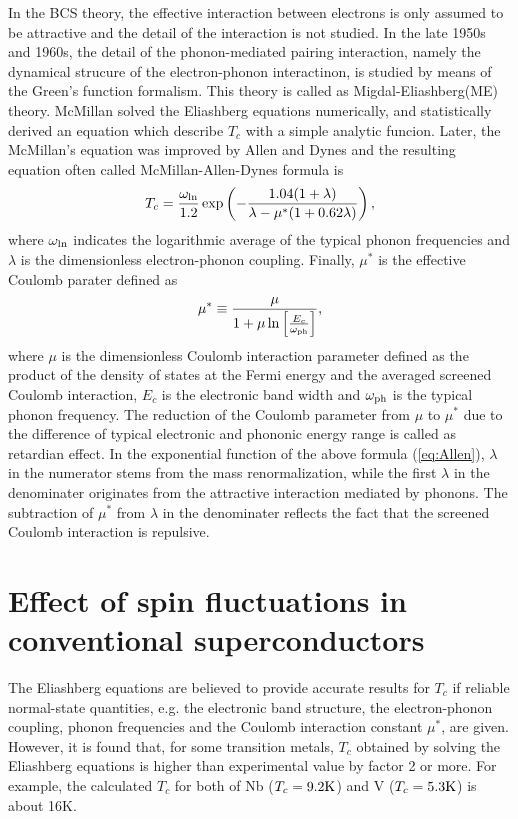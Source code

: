 In the BCS theory, the effective interaction between electrons is only assumed to be attractive and
the detail of the interaction is not studied.
In the late 1950s and 1960s, the detail of the phonon-mediated pairing interaction, namely the 
dynamical strucure of the electron-phonon interactinon, is studied by means of the Green's function 
formalism\cite{Migdal1958,Nambu1960,Eliashberg1960,Morel1962,Schrieffer1964,Scalapino1966}. 
This theory is called as Migdal-Eliashberg(ME) theory.
McMillan\cite{McMillan1968} solved the Eliashberg equations\cite{Parks1969} numerically, 
and statistically derived an equation which describe $T_c$ with a simple analytic funcion. 
Later, the McMillan's equation was improved by Allen and Dynes\cite{AllenDynes} and the resulting 
equation often called McMillan-Allen-Dynes formula is
%
\begin{equation}
	T_c = \frac{\omega_{\rm ln}}{1.2} \exp \left( -\frac{1.04(1+\lambda)}
	{\lambda-\mu^{\ast}(1+0.62\lambda)} \right),
	\label{eq:Allen}
\end{equation}
%
where $\omega_{\rm ln}$ indicates the logarithmic average of the typical phonon frequencies and
$\lambda$ is the dimensionless electron-phonon coupling. Finally, $\mu^{\ast}$ is the effective Coulomb
parater defined as
%
\begin{equation}
	\mu^{\ast} \equiv \frac{\mu}{1 + \mu \ln \left[ \frac{E_c}{\omega_{\rm ph}} \right]},
	\label{eq:mustar}
\end{equation}
%
where $\mu$ is the dimensionless Coulomb interaction parameter defined as the product of the density
of states at the Fermi energy and the averaged screened Coulomb interaction, $E_c$ is the
electronic band width and $\omega_{\rm ph}$ is the typical phonon frequency.
The reduction of the Coulomb parameter from $\mu$ to $\mu^{\ast}$ due to the difference of 
typical electronic and phononic energy range is called as retardian effect\cite{Bogo1958,Morel1962}.
In the exponential function of the above formula (\ref{eq:Allen}), $\lambda$ in the numerator
stems from the mass renormalization, while the first $\lambda$ in the denominater originates from
the attractive interaction mediated by phonons. The subtraction of $\mu^{\ast}$ from $\lambda$ in the
denominater reflects the fact that the screened Coulomb interaction is repulsive.

\section{Effect of spin fluctuations in conventional superconductors} %
The Eliashberg equations are believed to provide accurate results for $T_c$
if reliable normal-state quantities, e.g. the electronic band structure, the electron-phonon coupling,
phonon frequencies and the Coulomb interaction constant $\mu^{\ast}$, are given.
However, it is found that, for some transition metals, $T_c$ obtained by solving the 
Eliashberg equations is higher than experimental value by factor 2 or more.
For example, the calculated $T_c$ for both of Nb ($T_c = 9.2 \rm K$) and V ($T_c = 5.3 \rm K$) is
about 16K\cite{Papa1977}. 

